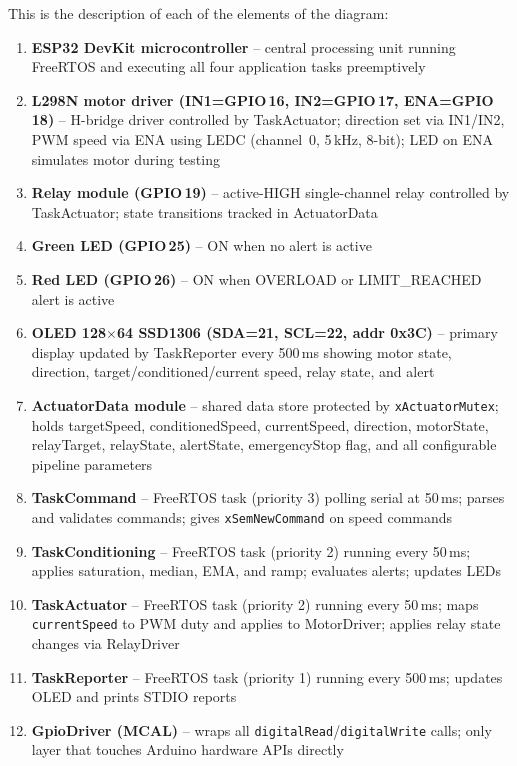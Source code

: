 This is the description of each of the elements of the diagram:
\begin{enumerate}
  \item \textbf{ESP32 DevKit microcontroller} -- central processing unit running FreeRTOS
    and executing all four application tasks preemptively
  \item \textbf{L298N motor driver (IN1=GPIO\,16, IN2=GPIO\,17, ENA=GPIO\,18)} --
    H-bridge driver controlled by TaskActuator; direction set via IN1/IN2, PWM speed
    via ENA using LEDC (channel~0, 5\,kHz, 8-bit); LED on ENA simulates motor during
    testing
  \item \textbf{Relay module (GPIO\,19)} -- active-HIGH single-channel relay controlled
    by TaskActuator; state transitions tracked in ActuatorData
  \item \textbf{Green LED (GPIO\,25)} -- ON when no alert is active
  \item \textbf{Red LED (GPIO\,26)} -- ON when OVERLOAD or LIMIT\_REACHED alert is active
  \item \textbf{OLED 128$\times$64 SSD1306 (SDA=21, SCL=22, addr 0x3C)} -- primary
    display updated by TaskReporter every 500\,ms showing motor state, direction,
    target/conditioned/current speed, relay state, and alert
  \item \textbf{ActuatorData module} -- shared data store protected by
    \texttt{xActuatorMutex}; holds targetSpeed, conditionedSpeed, currentSpeed,
    direction, motorState, relayTarget, relayState, alertState, emergencyStop flag,
    and all configurable pipeline parameters
  \item \textbf{TaskCommand} -- FreeRTOS task (priority 3) polling serial at 50\,ms;
    parses and validates commands; gives \texttt{xSemNewCommand} on speed commands
  \item \textbf{TaskConditioning} -- FreeRTOS task (priority 2) running every 50\,ms;
    applies saturation, median, EMA, and ramp; evaluates alerts; updates LEDs
  \item \textbf{TaskActuator} -- FreeRTOS task (priority 2) running every 50\,ms;
    maps \texttt{currentSpeed} to PWM duty and applies to MotorDriver; applies relay
    state changes via RelayDriver
  \item \textbf{TaskReporter} -- FreeRTOS task (priority 1) running every 500\,ms;
    updates OLED and prints STDIO reports
  \item \textbf{GpioDriver (MCAL)} -- wraps all \texttt{digitalRead}/\texttt{digitalWrite}
    calls; only layer that touches Arduino hardware APIs directly
\end{enumerate}

